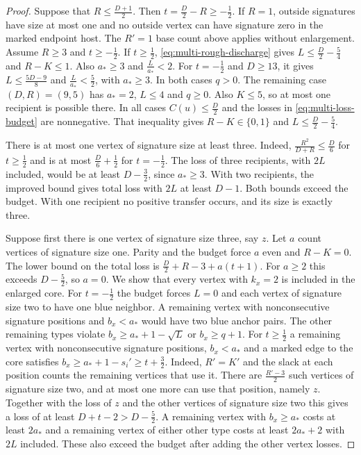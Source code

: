\documentclass[preprint,11pt,numbers]{elsarticle-arxiv}
\numberwithin{equation}{section}
\theoremstyle{definition}
\begin{document}
\begin{proof}
Suppose that $R\le\frac{D+1}{2}$. Then $t=\frac{D}{2}-R\ge-\frac{1}{2}$.
If $R=1$, outside signatures have size at most
one and no outside vertex can have signature zero in the marked
endpoint host. The $R'=1$ base count above applies without enlargement.
Assume $R\ge3$ and $t\ge-\frac{1}{2}$. If $t\ge\frac{1}{2}$,
\eqref{eq:multi-rough-discharge} gives $L\le \frac{D}{2}-\frac{5}{4}$ and $R-K\le1$.
Also $a_*\ge3$ and $\frac{L}{a_*}<2$. For $t=-\frac{1}{2}$ and $D\ge13$, it gives
$L\le\frac{5D-9}{8}$ and $\frac{L}{a_*}<\frac{5}{2}$, with $a_*\ge3$. In both cases
$q>0$. The remaining case $(D,R)=(9,5)$ has $a_*=2$, $L\le4$ and
$q\ge0$. Also $K\le5$, so at most one recipient is possible there.
In all cases $C(u)\le \frac{D}{2}$ and the losses in
\eqref{eq:multi-loss-budget} are nonnegative. That inequality gives
$R-K\in\{0,1\}$ and $L\le \frac{D}{2}-\frac{5}{4}$.

There is at most one vertex of signature size at least three.
Indeed, $\frac{R^2}{D+R}\le \frac{D}{6}$ for $t\ge\frac{1}{2}$ and is at most $\frac{D}{6}+\frac{1}{2}$
for $t=-\frac{1}{2}$. The loss of three recipients, with $2L$ included,
would be at least $D-\frac{3}{2}$, since $a_*\ge3$. With two recipients,
the improved bound gives total loss with $2L$ at least $D-1$.
Both bounds exceed the budget. With one recipient no positive
transfer occurs, and its size is exactly three.

Suppose first there is one vertex of signature size three, say $z$. Let $a$
count vertices of signature size one. Parity and the budget force $a$ even
and $R-K=0$. The lower bound on the total loss is
$\frac{D}{2}+R-3+a(t+1)$. For $a\ge2$ this exceeds $D-\frac{5}{2}$, so $a=0$.
We show that every vertex with $k_x=2$ is included in the enlarged core.
For $t=-\frac{1}{2}$ the budget forces $L=0$ and each vertex of signature size two
to have one blue neighbor. A remaining vertex with nonconsecutive
signature positions and $b_x<a_*$ would have two blue anchor pairs.
The other remaining types
violate $b_x\ge a_*+1-\sqrt L$ or $b_x\ge q+1$. For $t\ge\frac{1}{2}$ a
remaining vertex with nonconsecutive signature positions, $b_x<a_*$
and a marked edge to the core satisfies
$b_x\ge a_*+1-s_i'\ge t+\frac{3}{2}$. Indeed, $R'=K'$ and the slack
at each position counts the remaining vertices that use it.
There are $\frac{R'-3}{2}$ such vertices of signature size two,
and at most one more can use that position, namely $z$.
Together with the loss of $z$ and the other vertices of signature size two
this gives a loss of at least $D+t-2>D-\frac{5}{2}$. A remaining vertex with $b_x\ge a_*$
costs at least $2a_*$ and a remaining vertex of either other type
costs at least $2a_*+2$ with $2L$ included. These also exceed the
budget after adding the other vertex losses.


\end{proof}
\end{document}
